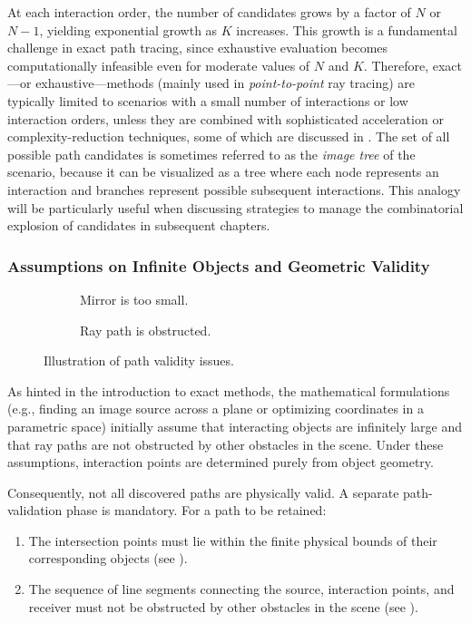 At each interaction order, the number of candidates grows by a factor of $N$ or $N-1$, yielding exponential growth as $K$ increases. This growth is a fundamental challenge in exact path tracing, since exhaustive evaluation becomes computationally infeasible even for moderate values of $N$ and $K$. Therefore, exact---or exhaustive---methods (mainly used in \emph{point-to-point} ray tracing) are typically limited to scenarios with a small number of interactions or low interaction orders, unless they are combined with sophisticated acceleration or complexity-reduction techniques, some of which are discussed in . The set of all possible path candidates is sometimes referred to as the \emph{image tree} of the scenario, because it can be visualized as a tree where each node represents an interaction and branches represent possible subsequent interactions. This analogy will be particularly useful when discussing strategies to manage the combinatorial explosion of candidates in subsequent chapters.

\subsubsection{Assumptions on Infinite Objects and Geometric Validity}

\begin{figure}
  \centering
  \begin{subfigure}[b]{0.49\contentwidth}
    \centering
    \caption{Mirror is too small.}
  \end{subfigure}
  \begin{subfigure}[b]{0.49\contentwidth}
    \centering
    \caption{Ray path is obstructed.}
  \end{subfigure}
  \caption{Illustration of path validity issues.}
\end{figure}

As hinted in the introduction to exact methods, the mathematical formulations (e.g., finding an image source across a plane or optimizing coordinates in a parametric space) initially assume that interacting objects are infinitely large and that ray paths are not obstructed by other obstacles in the scene. Under these assumptions, interaction points are determined purely from object geometry.

Consequently, not all discovered paths are physically valid. A separate path-validation phase is mandatory. For a path to be retained:
\begin{enumerate}
  \item The intersection points must lie within the finite physical bounds of their corresponding objects (see ).
  \item The sequence of line segments connecting the source, interaction points, and receiver must not be obstructed by other obstacles in the scene (see ).
\end{enumerate}

